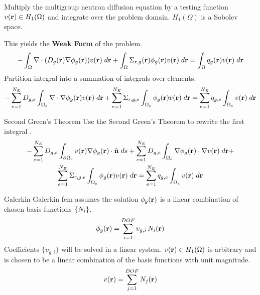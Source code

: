 \begin{frame}{}
  Multiply the multigroup neutron diffusion equation by a testing function
  $v(\mathbf{r}) \in H_1(\Omega)$ and integrate over the problem domain. $H_1(\Omega)$
  is a Sobolev space.
  
  \vspace{0.25in}
  This yields the \textbf{Weak Form} of the problem.
  \begin{equation}
    \label{eq:fem_weak_form}
    - \int_{\Omega} \mathbf{\nabla} \cdot (D_g(\mathbf{r}) \mathbf{\nabla} \phi_g(\mathbf{r})) v(\mathbf{r}) \; d\mathbf{r}
      + \int_{\Omega} \Sigma_{r,g}(\mathbf{r}) \phi_g(\mathbf{r}) v(\mathbf{r}) \;d\mathbf{r} =
      \int_{\Omega} q_g(\mathbf{r}) v(\mathbf{r}) \;d\mathbf{r}
  \end{equation}
  Partition integral into a summation of integrals over elements.
  \begin{equation}
    \label{eq:element_by_element}
    -\sum_{e=1}^{N_E} D_{g,e} 
      \int_{\Omega_e} \mathbf{\nabla} \cdot \mathbf{\nabla} \phi_g(\mathbf{r}) v(\mathbf{r}) \; d\mathbf{r} +
      \sum_{e=1}^{N_E} \Sigma_{r,g,e} \int_{\Omega_e} \phi_g(\mathbf{r}) v(\mathbf{r}) 
      \;d\mathbf{r} = \sum_{e=1}^{N_E} q_{g,e} \int_{\Omega_e} v(\mathbf{r}) 
      \; d\mathbf{r}
  \end{equation}
\end{frame}

\begin{frame}{Second Green's Theorem}
  Use the Second Green's Theorem to rewrite the first integral
  \cite{textbookli}.
  \begin{multline} 
    -\sum_{e=1}^{N_E} D_{g,e} \int_{\partial \Omega_e} v(\mathbf{r}) \mathbf{\nabla}
    \phi_g(\mathbf{r}) \cdot \hat{\mathbf{n}} \;ds + \sum_{e=1}^{N_E} 
      D_{g,e} \int_{\Omega_e} \mathbf{\nabla} \phi_g(\mathbf{r}) \cdot \mathbf{\nabla} v(\mathbf{r}) 
      \; d\mathbf{r} + \\
      \sum_{e=1}^{N_E} \Sigma_{r,g,e} \int_{\Omega_e} \phi_g(\mathbf{r}) v(\mathbf{r}) 
     \; d\mathbf{r} =
      \sum_{e=1}^{N_E} q_{g,e} \int_{\Omega_e} v(\mathbf{r}) \; d\mathbf{r}
  \end{multline}
\end{frame}

\begin{frame}{Galerkin }
  Galerkin \gls{fem} assumes the solution $\phi_g(\mathbf{r})$ is a linear
  combination of chosen basis functions $\{N_i\}$.
  \begin{equation} 
    \label{eq:linear_combination}
    \phi_g(\mathbf{r}) = \sum_{i=1}^{DOF} \upsilon_{g,i} \, N_i(\mathbf{r})
  \end{equation}
  Coefficients $\{\upsilon_{g,i}\}$ will be solved in a linear system.
  $v(\mathbf{r}) \in H_1(\Omega)$ is arbitrary and is chosen to be a
  linear combination of the basis functions with unit magnitude.
  \begin{equation} 
    \label{eq:linear_superposition}
    v(\mathbf{r}) = \sum_{j=1}^{DOF} N_j(\mathbf{r})
  \end{equation}
\end{frame}

